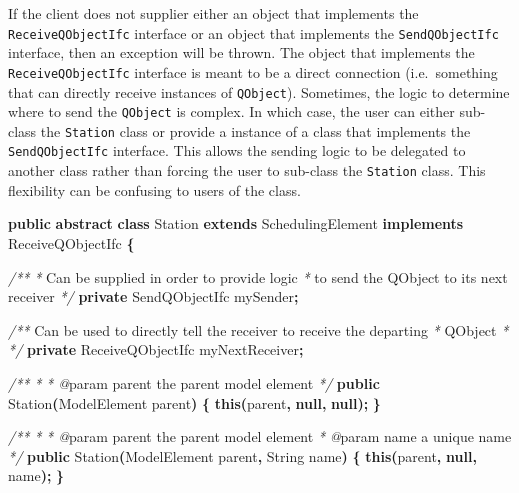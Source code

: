 \documentclass[
]{book}
\newenvironment{Shaded}{\begin{snugshade}}{\end{snugshade}}
\newcommand{\BuiltInTok}[1]{#1}
\newcommand{\CommentTok}[1]{\textcolor[rgb]{0.56,0.35,0.01}{\textit{#1}}}
\newcommand{\FunctionTok}[1]{\textcolor[rgb]{0.00,0.00,0.00}{#1}}
\newcommand{\KeywordTok}[1]{\textcolor[rgb]{0.13,0.29,0.53}{\textbf{#1}}}
\newcommand{\NormalTok}[1]{#1}
\newcommand{\OperatorTok}[1]{\textcolor[rgb]{0.81,0.36,0.00}{\textbf{#1}}}
\theoremstyle{definition}
\theoremstyle{definition}
\theoremstyle{definition}
\theoremstyle{definition}
\theoremstyle{remark}
\begin{document}
If the client does not supplier either an object that implements the \texttt{ReceiveQObjectIfc} interface or an object that implements the \texttt{SendQObjectIfc} interface, then an exception will be thrown. The object that implements the \texttt{ReceiveQObjectIfc} interface is meant to be a direct connection (i.e.~something that can directly receive instances of \texttt{QObject}). Sometimes, the logic to determine where to send the \texttt{QObject} is complex. In which case, the user can either sub-class the \texttt{Station} class or provide a instance of a class that implements the \texttt{SendQObjectIfc} interface. This allows the sending logic to be delegated to another class rather than forcing the user to sub-class the \texttt{Station} class. This flexibility can be confusing to users of the class.

\begin{Shaded}
\begin{Highlighting}[]
\KeywordTok{public} \KeywordTok{abstract} \KeywordTok{class}\NormalTok{ Station }\KeywordTok{extends}\NormalTok{ SchedulingElement }\KeywordTok{implements}\NormalTok{ ReceiveQObjectIfc }\OperatorTok{\{}

    \CommentTok{/**}
     \CommentTok{*}\NormalTok{ Can be supplied in order to provide logic}
     \CommentTok{*}\NormalTok{  to send the QObject to its next receiver}
     \CommentTok{*/}
    \KeywordTok{private}\NormalTok{ SendQObjectIfc mySender}\OperatorTok{;}

    \CommentTok{/**}\NormalTok{ Can be used to directly tell the receiver to receive the departing}
     \CommentTok{*}\NormalTok{  QObject}
     \CommentTok{*} 
     \CommentTok{*/}
    \KeywordTok{private}\NormalTok{ ReceiveQObjectIfc myNextReceiver}\OperatorTok{;}

    \CommentTok{/**}
     \CommentTok{*}
\CommentTok{     * @}\NormalTok{param parent the parent model element}
     \CommentTok{*/}
    \KeywordTok{public} \FunctionTok{Station}\OperatorTok{(}\NormalTok{ModelElement parent}\OperatorTok{)} \OperatorTok{\{}
        \KeywordTok{this}\OperatorTok{(}\NormalTok{parent}\OperatorTok{,} \KeywordTok{null}\OperatorTok{,} \KeywordTok{null}\OperatorTok{);}
    \OperatorTok{\}}

    \CommentTok{/**}
     \CommentTok{*}
\CommentTok{     * @}\NormalTok{param parent the parent model element}
     \CommentTok{*} \CommentTok{@}\NormalTok{param name a unique name}
     \CommentTok{*/}
    \KeywordTok{public} \FunctionTok{Station}\OperatorTok{(}\NormalTok{ModelElement parent}\OperatorTok{,} \BuiltInTok{String}\NormalTok{ name}\OperatorTok{)} \OperatorTok{\{}
        \KeywordTok{this}\OperatorTok{(}\NormalTok{parent}\OperatorTok{,} \KeywordTok{null}\OperatorTok{,}\NormalTok{ name}\OperatorTok{);}
    \OperatorTok{\}}


\end{Highlighting}
\end{Shaded}
\end{document}
